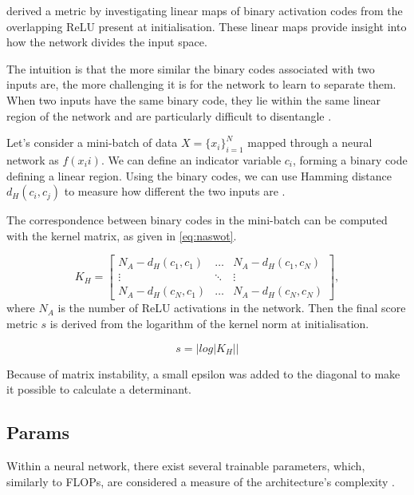 \cite{jacob_conv} derived a metric by investigating linear maps of binary activation codes from the overlapping ReLU present at initialisation. These linear maps provide insight into how the network divides the input space.

The intuition is that the more similar the binary codes associated with two inputs are, the more challenging it is for the network to learn to separate them. When two inputs have the same binary code, they lie within the same linear region of the network and are particularly difficult to disentangle \autocite{jacob_conv}.

Let's consider a mini-batch of data $X = \{x_i\}^N_{i=1}$ mapped through a neural network as $f(x_ii)$. We can define an indicator variable $c_i$, forming a binary code defining a linear region. Using the binary codes, we can use Hamming distance $d_H(c_i, c_j)$ to measure how different the two inputs are \autocite{jacob_conv}.

The correspondence between binary codes in the mini-batch can be computed with the kernel matrix, as given in \cref{eq:naswot}.

\begin{equation} 
K_H = \begin{bmatrix} 
        N_A-d_H(c_1, c_1) & \dots & N_A-d_H(c_1, c_N) \\ 
        \vdots & \ddots & \vdots \\ 
        N_A-d_H(c_N, c_1) & \dots & N_A-d_H(c_N, c_N)
    \end{bmatrix}, 
    \label{eq:naswot}
\end{equation}
where $N_A$ is the number of ReLU activations in the network. Then the final score metric $s$ is derived from the logarithm of the kernel norm at initialisation. 

\begin{equation}
s = |log|K_H||
\end{equation}


Because of matrix instability, a small epsilon was added to the diagonal to make it possible to calculate a determinant.


\subsection{Params}
Within a neural network, there exist several trainable parameters, which, similarly to \gls{FLOPs}, are considered a measure of the architecture's complexity \autocite{ning2021evaluating}. 

